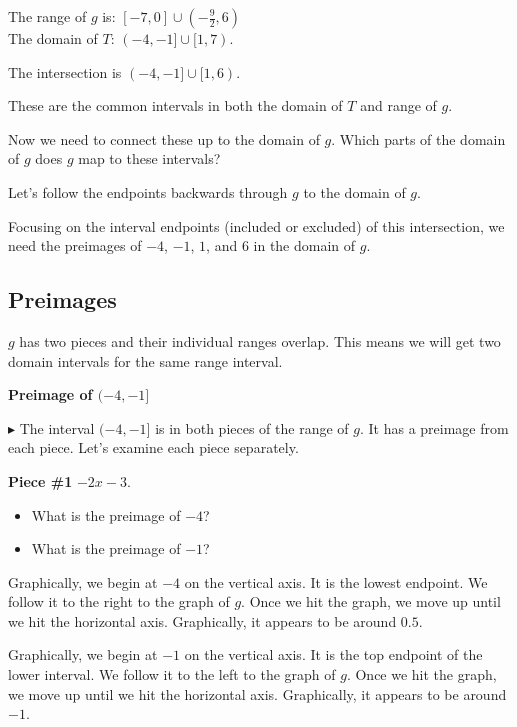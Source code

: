 \documentclass{ximera}
\begin{document}
The range of $g$ is: $[-7, 0] \cup \left( -\frac{9}{2}, 6 \right)$ \\
The domain of $T$:  $(-4,-1] \cup [1, 7)$.






The intersection is $(-4, -1] \cup [1, 6)$.



These are the common intervals in both the domain of $T$ and range of $g$.   

Now we need to connect these up to the domain of $g$.  Which parts of the domain of $g$ does $g$ map to these intervals?

Let's follow the endpoints backwards through $g$ to the domain of $g$.




Focusing on the interval endpoints (included or excluded) of this intersection, we need the preimages of $-4$, $-1$, $1$, and $6$ in the domain of $g$.  




\subsection*{Preimages}

$g$ has two pieces and their individual ranges overlap.  This means we will get two domain intervals for the same range interval. 




\textbf{\textcolor{red!75!green}{Preimage of $(-4,-1]$}} 




$\blacktriangleright$ The interval $(-4, -1]$ is in both pieces of the range of $g$.  It has a preimage from each piece.  Let's examine each piece separately.  

\textbf{Piece \#1} $-2x - 3$. 


\begin{itemize}
\item What is the preimage of $-4$? 
\item What is the preimage of $-1$? 
\end{itemize}



Graphically, we begin at $-4$ on the vertical axis.  It is the lowest endpoint.  We follow it to the right to the graph of $g$.  Once we hit the graph, we move up until we hit the horizontal axis.  Graphically, it appears to be around $0.5$.


Graphically, we begin at $-1$ on the vertical axis.  It is the top endpoint of the lower interval.  We follow it to the left to the graph of $g$.  Once we hit the graph, we move up until we hit the horizontal axis.  Graphically, it appears to be around $-1$.
\end{document}
